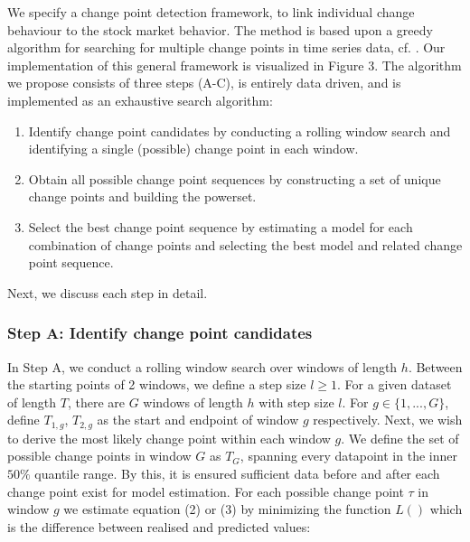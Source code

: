 We specify a change point detection framework, to link individual change behaviour to the stock market behavior. 
The method is based upon a greedy algorithm for searching for multiple change points in time series data, cf. \citet{bai2023multiple}. Our implementation of this general framework is visualized in Figure 3. The algorithm we propose consists of three steps (A-C), is entirely data driven, and is implemented as an exhaustive search algorithm:
\begin{enumerate}[label=Step \Alph*:]
	\item Identify change point candidates by conducting a rolling window search and identifying a single (possible) change point in each window.
	\item Obtain all possible change point sequences by constructing a set of unique change points and building the powerset.
	\item Select the best change point sequence by estimating a model for each combination of change points and selecting the best model and related change point sequence.
\end{enumerate} 
Next, we discuss each step in detail.

\subsubsection*{Step A: Identify change point candidates} 
In Step A, we conduct a rolling window search over windows of length $h$. Between the starting points of 2 windows, we define a step size $l \geq 1$. For a given dataset of length $T$, there are $G$ windows of length $h$ with step size $l$. %
For $g \in \{1, ..., G\}$, define  $T_{1,g}$, $T_{2,g}$ as the start and endpoint of window $g$ respectively. Next, we wish to derive the most likely change point within each window $g$. We define the set of possible change points in window $G$ as $T_G$, spanning every datapoint in the inner $50\%$ quantile range. By this, it is ensured sufficient data before and after each change point exist for model estimation. For each possible change point $\tau$ in window $g$ we estimate equation (2) or (3) by minimizing the function $L()$ which is the difference between realised and predicted values:

